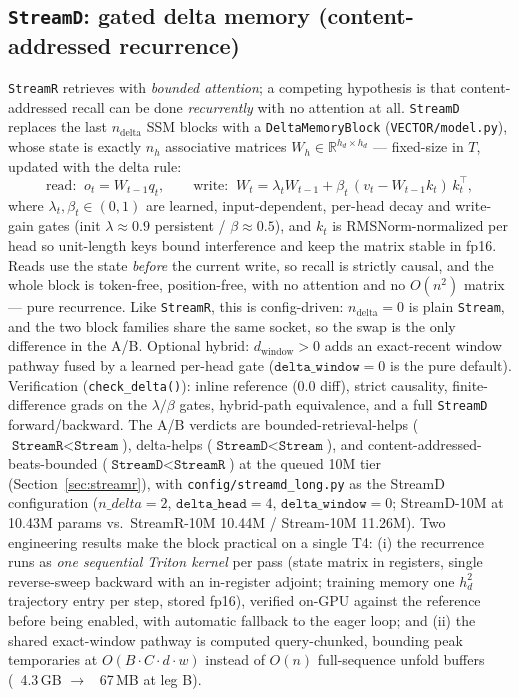 \documentclass[11pt]{article}
\newcommand{\Stream}{\texttt{Stream}}
\newcommand{\StreamR}{\texttt{StreamR}}
\newcommand{\StreamD}{\texttt{StreamD}}
\begin{document}
\subsection{\StreamD{}: gated delta memory (content-addressed recurrence)}
\label{sec:streamd}
\StreamR{} retrieves with \emph{bounded attention}; a competing hypothesis is
that content-addressed recall can be done \emph{recurrently} with no attention
at all. \StreamD{} replaces the last $n_{\text{delta}}$ SSM blocks with a
\texttt{DeltaMemoryBlock} (\texttt{VECTOR/model.py}), whose state is exactly
$n_h$ associative matrices $W_h\!\in\!\mathbb{R}^{h_d\times h_d}$ ---
fixed-size in $T$, updated with the delta rule:
\begin{equation}
\text{read:}\;\; o_t=W_{t-1} q_t, \qquad
\text{write:}\;\; W_t=\lambda_t W_{t-1}+\beta_t\,(v_t-W_{t-1}k_t)\,k_t^{\top},
\label{eq:delta}
\end{equation}
where $\lambda_t,\beta_t\!\in\!(0,1)$ are learned, input-dependent, per-head
decay and write-gain gates (init $\lambda\!\approx\!0.9$ persistent /
$\beta\!\approx\!0.5$), and $k_t$ is RMSNorm-normalized per head so unit-length
keys bound interference and keep the matrix stable in fp16. Reads use the
state \emph{before} the current write, so recall is strictly causal, and the
whole block is token-free, position-free, with no attention and no $O(n^2)$
matrix --- pure recurrence. Like \StreamR{}, this is config-driven:
$n_{\text{delta}}{=}0$ is plain \Stream{}, and the two block families share
the same socket, so the swap is the only difference in the A/B. Optional
hybrid: $d_{\text{window}}{>}0$ adds an exact-recent window pathway fused by a
learned per-head gate ($\texttt{delta\_window}{=}0$ is the pure default).
Verification (\texttt{check\_delta()}): inline reference (0.0 diff), strict
causality, finite-difference grads on the $\lambda/\beta$ gates, hybrid-path
equivalence, and a full \StreamD{} forward/backward. The A/B verdicts are
bounded-retrieval-helps ($\StreamR{<}\Stream$), delta-helps
($\StreamD{<}\Stream$), and content-addressed-beats-bounded
($\StreamD{<}\StreamR$) at the queued 10M tier (Section~\ref{sec:streamr}),
with \texttt{config/streamd\_long.py} as the StreamD configuration
($n\_delta{=}2$, $\texttt{delta\_head}{=}4$, $\texttt{delta\_window}{=}0$;
StreamD-10M at 10.43M params vs.\ StreamR-10M 10.44M / Stream-10M 11.26M).
Two engineering results make the block practical on a single T4:
(i) the recurrence runs as \emph{one sequential Triton kernel} per pass
(state matrix in registers, single reverse-sweep backward with an in-register
adjoint; training memory one $h_d^2$ trajectory entry per step, stored fp16),
verified on-GPU against the reference before being enabled, with automatic
fallback to the eager loop; and (ii) the shared exact-window pathway is
computed query-chunked, bounding peak temporaries at $O(B\cdot C\cdot d\cdot w)$
instead of $O(n)$ full-sequence unfold buffers (~4.3\,GB $\to$ ~67\,MB at leg B).
\end{document}
